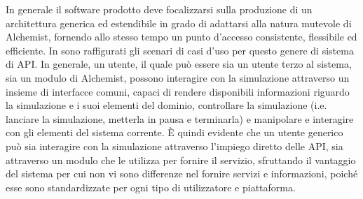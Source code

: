 In generale il software prodotto deve focalizzarsi sulla produzione di un architettura generica ed estendibile in grado di adattarsi alla natura mutevole di Alchemist, fornendo allo stesso tempo
un punto d'accesso consistente, flessibile ed efficiente. In  sono raffigurati gli scenari di casi d'uso per questo genere di sistema di \ac{API}.
%
In generale, un utente, il quale può essere sia un utente terzo al sistema, sia un modulo di Alchemist, possono interagire con la simulazione attraverso un insieme di interfacce comuni, capaci di
rendere disponibili informazioni riguardo la simulazione e i suoi elementi del dominio, controllare la simulazione (i.e. lanciare la simulazione, metterla in pausa e terminarla) e manipolare e interagire
con gli elementi del sistema corrente. È quindi evidente che un utente generico può sia interagire con la simulazione attraverso l'impiego diretto delle \ac{API}, sia attraverso un modulo che le
utilizza per fornire il servizio, sfruttando il vantaggio del sistema per cui non vi sono differenze nel fornire servizi e informazioni, poiché esse sono standardizzate per ogni tipo di utilizzatore e 
piattaforma.
